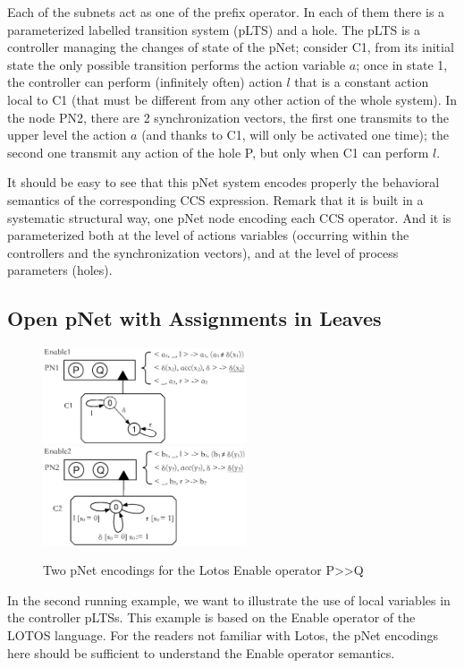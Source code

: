 \documentclass{lncs/llncs}
\begin{document}
  Each of the subnets act as one of the prefix operator.
In each of them there is a parameterized labelled transition system
(pLTS) and a hole. The pLTS is a controller managing the
changes of state of the pNet; consider C1, from its initial state the
only possible transition performs the action variable $a$; once in
state 1, the controller can perform (infinitely often) action $l$ that
is a constant action local to C1 (that must be different from any
other action of the whole system). In the node PN2, there are 2
synchronization vectors, the first one transmits to the upper level the
action $a$ (and thanks to C1, will only be activated one time); the
second one transmit any action of the hole P, but only when C1 can
perform $l$.

It should be easy to see that this pNet system encodes properly the
behavioral semantics of the corresponding CCS expression. Remark
that it is built in a systematic structural way, one pNet node
encoding each CCS operator. And it is parameterized both at the level
of actions variables (occurring within the controllers and the synchronization
vectors), and at the level of process parameters 
(holes). 

\subsection{Open pNet with Assignments in Leaves}
\begin{figure}[h]

  \includegraphics[width=6cm]{XFIG/Enable1.eps}
  \includegraphics[width=6cm]{XFIG/Enable2.eps}
  \caption{Two pNet encodings for the Lotos Enable operator P>>Q }  \label{schema:enable-pnets}

\end{figure}

In the second running example, we want to illustrate the use of local
variables in the controller pLTSs. This example is based on the Enable
operator of the LOTOS language. For the readers not familiar with
Lotos, the pNet encodings here should be sufficient to understand the
Enable operator semantics.
\end{document}
